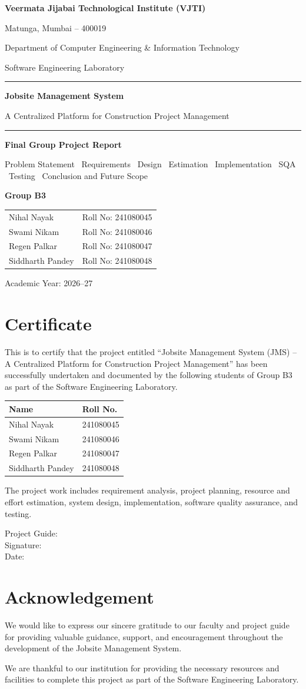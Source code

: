 \documentclass[11pt,a4paper]{article}
\makeatletter
\newcommand{\hrow}{\rowcolor{gray!14}}
\newcommand{\tablestyle}{\centering\small\renewcommand{\arraystretch}{1.3}}
\newcommand{\teamlist}{%
\begin{tabular}{@{}l@{\hspace{2.2cm}}l@{}}
Nihal Nayak & Roll No: 241080045\\
Swami Nikam & Roll No: 241080046\\
Regen Palkar & Roll No: 241080047\\
Siddharth Pandey & Roll No: 241080048
\end{tabular}}
\newcommand{\coverpage}[2]{%
\clearpage
\thispagestyle{plain}
\begin{center}
{\large\bfseries Veermata Jijabai Technological Institute (VJTI)\par}
Matunga, Mumbai -- 400019\par
\vspace{3pt}
Department of Computer Engineering \& Information Technology\par
Software Engineering Laboratory\par
\vspace{1.8cm}
\rule{\linewidth}{0.8pt}\par
\vspace{0.5cm}
{\fontsize{26}{30}\selectfont\bfseries Jobsite Management System\par}
\vspace{0.4cm}
{\large A Centralized Platform for Construction Project Management\par}
\vspace{0.5cm}
\rule{\linewidth}{0.8pt}\par
\vspace{1.6cm}
{\Large\bfseries #1\par}
\vspace{0.5cm}
{\large #2\par}
\vspace{1.6cm}
{\bfseries Group B3}\par
\vspace{0.4cm}
\teamlist\par
\vspace{1.4cm}
Academic Year: 2026--27
\end{center}
\clearpage}
\makeatother
\begin{document}
\coverpage{Final Group Project Report}{Problem Statement \textbullet\ Requirements \textbullet\ Design \textbullet\ Estimation \textbullet\ Implementation \textbullet\ SQA \textbullet\ Testing \textbullet\ Conclusion and Future Scope}

\section*{Certificate}
This is to certify that the project entitled ``Jobsite Management System (JMS) -- A Centralized Platform for Construction Project Management'' has been successfully undertaken and documented by the following students of Group B3 as part of the Software Engineering Laboratory.

\begin{table}[H]
\tablestyle
\begin{tabularx}{0.7\linewidth}{Yl}
\toprule
\hrow\textbf{Name} & \textbf{Roll No.}\\
\midrule
Nihal Nayak & 241080045\\
Swami Nikam & 241080046\\
Regen Palkar & 241080047\\
Siddharth Pandey & 241080048\\
\bottomrule
\end{tabularx}
\end{table}

The project work includes requirement analysis, project planning, resource and effort estimation, system design, implementation, software quality assurance, and testing.

\vspace{1.6cm}
Project Guide: \underline{\hspace{6cm}}\\[14pt]
Signature: \underline{\hspace{6.6cm}}\\[14pt]
Date: \underline{\hspace{7.4cm}}

\clearpage
\section*{Acknowledgement}
We would like to express our sincere gratitude to our faculty and project guide for providing valuable guidance, support, and encouragement throughout the development of the Jobsite Management System.

We are thankful to our institution for providing the necessary resources and facilities to complete this project as part of the Software Engineering Laboratory.
\end{document}
